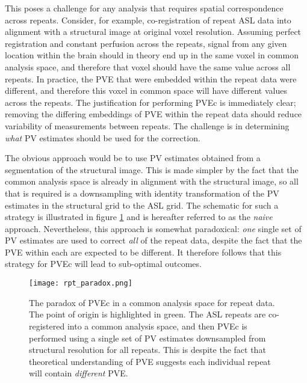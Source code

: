 This poses a challenge for any analysis that requires spatial correspondence across repeats. Consider, for example, co-registration of repeat ASL data into alignment with a structural image at original voxel resolution. Assuming perfect registration and constant perfusion across the repeats, signal from any given location within the brain should in theory end up in the same voxel in common analysis space, and therefore that voxel should have the same value across all repeats. In practice, the PVE that were embedded within the repeat data were different, and therefore this voxel in common space will have different values across the repeats. The justification for performing PVEc is immediately clear; removing the differing embeddings of PVE within the repeat data should reduce variability of measurements between repeats. The challenge is in determining \textit{what} PV estimates should be used for the correction. 

The obvious approach would be to use PV estimates obtained from a segmentation of the structural image. This is made simpler by the fact that the common analysis space is already in alignment with the structural image, so all that is required is a downsampling with identity transformation of the PV estimates in the structural grid to the ASL grid. The schematic for such a strategy is illustrated in figure \ref{rpt_paradox} and is hereafter referred to as the \textit{naive} approach. Nevertheless, this approach is somewhat paradoxical: \textit{one} single set of PV estimates are used to correct \textit{all} of the repeat data, despite the fact that the PVE within each are expected to be different. It therefore follows that this strategy for PVEc will lead to sub-optimal outcomes. 

\begin{figure}
\centering
\texttt{[image: rpt\_paradox.png]}
\caption{The paradox of PVEc in a common analysis space for repeat data. The point of origin is highlighted in green. The ASL repeats are co-registered into a common analysis space, and then PVEc is performed using a single set of PV estimates downsampled from structural resolution for all repeats. This is despite the fact that theoretical understanding of PVE suggests each individual repeat will contain \textit{different} PVE.}
\label{rpt_paradox}
\end{figure}


